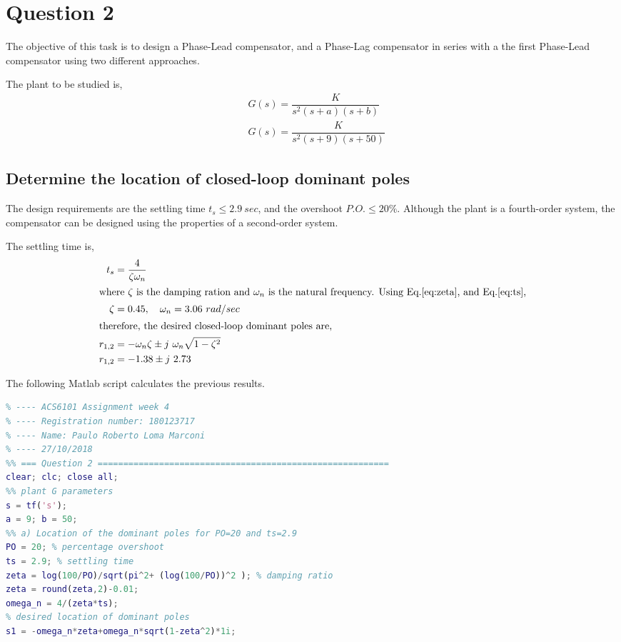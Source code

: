 \documentclass[11pt, a4paper]{article}
\begin{document}
\section{Question 2}
The objective of this task is to design a Phase-Lead compensator, and a Phase-Lag compensator in series with a the first Phase-Lead compensator using two different approaches. 

The plant to be studied is,
\begin{align}
& G(s)=\dfrac{K}{s^2(s+a)(s+b)} \label{eq:G2}\\
& G(s)=\dfrac{K}{s^2(s+9)(s+50)} \nonumber
\end{align} 

\subsection{Determine the location of closed-loop dominant poles}
The design requirements are the settling time $t_s\leq 2.9~ sec$, and the overshoot $P.O.\leq 20\%$. Although the plant is a fourth-order system, the compensator can be designed using the properties of a second-order system. 

The settling time is,
\begin{align}
t_s &= \frac{4}{\zeta\omega_n} \label{eq:ts}\\
\intertext{where $\zeta$ is the damping ration and $\omega_n$ is the natural frequency. Using Eq.\eqref{eq:zeta}, and Eq.\eqref{eq:ts},}
\zeta &= 0.45, \quad \omega_n = 3.06 ~rad/sec \nonumber\\
\intertext{therefore, the desired closed-loop dominant poles are,}
r_{1,2} &= -\omega_n\zeta\pm j~\omega_n\sqrt{1-\zeta^2}\\
r_{1,2} &= -1.38\pm j~2.73 \nonumber
\end{align}

The following Matlab script calculates the previous results.
\begin{lstlisting}[language=matlab, caption={}, label={}]
%% ========================================================================
% ---- ACS6101 Assignment week 4
% ---- Registration number: 180123717
% ---- Name: Paulo Roberto Loma Marconi
% ---- 27/10/2018
%% === Question 2 =========================================================
clear; clc; close all;
%% plant G parameters
s = tf('s');
a = 9; b = 50;
%% a) Location of the dominant poles for PO=20 and ts=2.9
PO = 20; % percentage overshoot
ts = 2.9; % settling time
zeta = log(100/PO)/sqrt(pi^2+ (log(100/PO))^2 ); % damping ratio
zeta = round(zeta,2)-0.01;
omega_n = 4/(zeta*ts);
% desired location of dominant poles
s1 = -omega_n*zeta+omega_n*sqrt(1-zeta^2)*1i;
\end{lstlisting}
\end{document}
